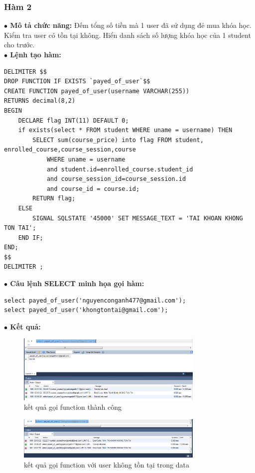 \documentclass[12pt,a4paper,titlepage]{article}
\begin{document}
\subsubsection{Hàm 2}
\textbf{$\bullet$ Mô tả chức năng:} Đếm tổng số tiền mà 1 user đã sử dụng đẻ mua khóa học. Kiểm tra user có tồn tại không. Hiển danh sách số lượng khóa học của 1 student cho trước. \\
\textbf{$\bullet$ Lệnh tạo hàm:}
\begin{lstlisting}
DELIMITER $$
DROP FUNCTION IF EXISTS `payed_of_user`$$
CREATE FUNCTION payed_of_user(username VARCHAR(255))
RETURNS decimal(8,2)
BEGIN
	DECLARE flag INT(11) DEFAULT 0;
	if exists(select * FROM student WHERE uname = username) THEN
		SELECT sum(course_price) into flag FROM student, enrolled_course,course_session,course
			WHERE uname = username
			and student.id=enrolled_course.student_id
			and course_session_id=course_session.id
			and course_id = course.id;
		RETURN flag;
	ELSE
		SIGNAL SQLSTATE '45000' SET MESSAGE_TEXT = 'TAI KHOAN KHONG TON TAI';
    END IF;
END;
$$
DELIMITER ;
\end{lstlisting}
\textbf{$\bullet$ Câu lệnh SELECT minh họa gọi hàm:}
\begin{lstlisting}
select payed_of_user('nguyenconganh477@gmail.com');
select payed_of_user('khongtontai@gmail.com');
\end{lstlisting}
\textbf{$\bullet$ Kết quả:}
\begin{figure}[h!]
	\centering
	\caption{kết quả gọi function thành công}
	\includegraphics[width=0.8\textwidth]{images/image4.png}
\end{figure}
\begin{figure}[h!]
	\centering
	\caption{kết quả gọi function với user không tồn tại trong data}
	\includegraphics[width=0.8\textwidth]{images/image3.png}
\end{figure}
\newpage
\end{document}
